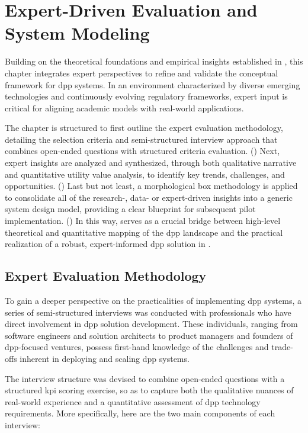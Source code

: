 \chapter{Expert-Driven Evaluation and System Modeling}
\label{cha:chapter_4}

Building on the theoretical foundations and empirical insights established in , this chapter integrates expert perspectives to refine and validate the conceptual framework for \acrlong{dpp} systems. In an environment characterized by diverse emerging technologies and continuously evolving regulatory frameworks, expert input is critical for aligning academic models with real-world applications.

The chapter is structured to first outline the expert evaluation methodology, detailing the selection criteria and semi-structured interview approach that combines open-ended questions with structured criteria evaluation. () Next, expert insights are analyzed and synthesized, through both qualitative narrative and quantitative utility value analysis, to identify key trends, challenges, and opportunities. () Last but not least, a morphological box methodology is applied to consolidate all of the research-, data- or expert-driven insights into a generic system design model, providing a clear blueprint for subsequent pilot implementation. () In this way,  serves as a crucial bridge between high-level theoretical and quantitative mapping of the \ac{dpp} landscape and the practical realization of a robust, expert-informed \ac{dpp} solution in .

\section{Expert Evaluation Methodology}
\label{sec:expert_evaluation_methodology}

To gain a deeper perspective on the practicalities of implementing \ac{dpp} systems, a series of semi-structured interviews was conducted with professionals who have direct involvement in \ac{dpp} solution development. These individuals, ranging from software engineers and solution architects to product managers and founders of \ac{dpp}-focused ventures, possess first-hand knowledge of the challenges and trade-offs inherent in deploying and scaling \ac{dpp} systems.

The interview structure was devised to combine open-ended questions with a structured \ac{kpi} scoring exercise, so as to capture both the qualitative nuances of real-world experience and a quantitative assessment of \ac{dpp} technology requirements. More specifically, here are the two main components of each interview: 

